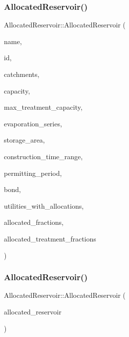 \subsubsection{\texorpdfstring{Allocated\+Reservoir()}{AllocatedReservoir()}\hspace{0.1cm}{\footnotesize\ttfamily [4/5]}}
{\footnotesize\ttfamily Allocated\+Reservoir\+::\+Allocated\+Reservoir (\begin{DoxyParamCaption}\item[{const char $\ast$}]{name,  }\item[{const int}]{id,  }\item[{const vector$<$ \mbox{\hyperlink{classCatchment}{Catchment}} $\ast$$>$ \&}]{catchments,  }\item[{const double}]{capacity,  }\item[{const double}]{max\+\_\+treatment\+\_\+capacity,  }\item[{\mbox{\hyperlink{classEvaporationSeries}{Evaporation\+Series}} \&}]{evaporation\+\_\+series,  }\item[{double}]{storage\+\_\+area,  }\item[{const vector$<$ double $>$ \&}]{construction\+\_\+time\+\_\+range,  }\item[{double}]{permitting\+\_\+period,  }\item[{\mbox{\hyperlink{classBond}{Bond}} \&}]{bond,  }\item[{vector$<$ int $>$ $\ast$}]{utilities\+\_\+with\+\_\+allocations,  }\item[{vector$<$ double $>$ $\ast$}]{allocated\+\_\+fractions,  }\item[{vector$<$ double $>$ $\ast$}]{allocated\+\_\+treatment\+\_\+fractions }\end{DoxyParamCaption})}

\mbox{\label{classAllocatedReservoir_a59098eb446ada7a23e914543f3c419c0}} 
\subsubsection{\texorpdfstring{Allocated\+Reservoir()}{AllocatedReservoir()}\hspace{0.1cm}{\footnotesize\ttfamily [5/5]}}
{\footnotesize\ttfamily Allocated\+Reservoir\+::\+Allocated\+Reservoir (\begin{DoxyParamCaption}\item[{const \mbox{\hyperlink{classAllocatedReservoir}{Allocated\+Reservoir}} \&}]{allocated\+\_\+reservoir }\end{DoxyParamCaption})}

